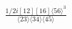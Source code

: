 \documentclass[varwidth, border=5pt]{standalone}
\begin{document}
\begin{my}
$\begin{gathered}
\scriptscriptstyle\frac{1/2i[12][16]\langle56\rangle^3}{\langle23\rangle\langle34\rangle\langle45\rangle}
\end{gathered}$
\end{my}
\end{document}
